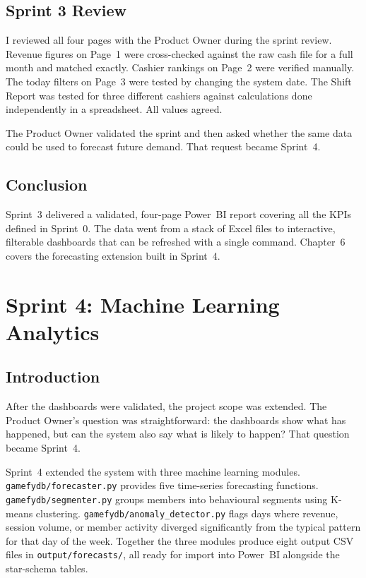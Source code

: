 \documentclass[12pt, a4paper]{report}
\begin{document}
\section{Sprint 3 Review}

I reviewed all four pages with the Product Owner during the sprint review. Revenue
figures on Page~1 were cross-checked against the raw cash file for a full month and
matched exactly. Cashier rankings on Page~2 were verified manually. The today filters
on Page~3 were tested by changing the system date. The Shift Report was tested for
three different cashiers against calculations done independently in a spreadsheet.
All values agreed.

The Product Owner validated the sprint and then asked whether the same data could
be used to forecast future demand. That request became Sprint~4.

\section{Conclusion}

Sprint~3 delivered a validated, four-page Power~BI report covering all the KPIs
defined in Sprint~0. The data went from a stack of Excel files to interactive,
filterable dashboards that can be refreshed with a single command. Chapter~6 covers
the forecasting extension built in Sprint~4.

\chapter{Sprint 4: Machine Learning Analytics}

\section{Introduction}

After the dashboards were validated, the project scope was extended. The Product
Owner's question was straightforward: the dashboards show what has happened, but can
the system also say what is likely to happen? That question became Sprint~4.

Sprint~4 extended the system with three machine learning modules.
\texttt{gamefydb/forecaster.py} provides five time-series forecasting functions.
\texttt{gamefydb/segmenter.py} groups members into behavioural segments using
K-means clustering. \texttt{gamefydb/anomaly\_detector.py} flags days where
revenue, session volume, or member activity diverged significantly from the
typical pattern for that day of the week. Together the three modules produce
eight output CSV files in \texttt{output/forecasts/}, all ready for import into
Power~BI alongside the star-schema tables.
\end{document}
